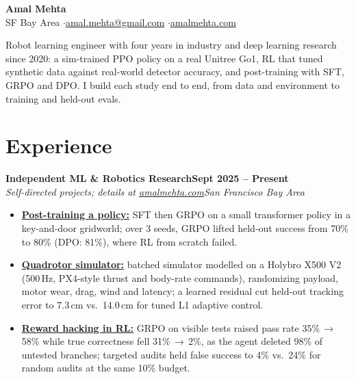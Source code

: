 \documentclass[10pt]{article}
\newcommand{\role}[4]{\textbf{#1}\hfill\textbf{#2}\\\textit{#3}\hfill\textit{#4}}
\begin{document}
\fontsize{9.8}{10.8}\selectfont

\begin{center}
{\LARGE\bfseries Amal Mehta}\\[3pt]
SF Bay Area \quad$\cdot$\quad \href{mailto:amal.mehta@gmail.com}{amal.mehta@gmail.com} \quad$\cdot$\quad \href{https://amalmehta.com/}{amalmehta.com}
\end{center}

Robot learning engineer with four years in industry and deep learning research since 2020: a sim-trained PPO policy on a real Unitree Go1, RL that tuned synthetic data against real-world detector accuracy, and post-training with SFT, GRPO and DPO. I build each study end to end, from data and environment to training and held-out evals.

\section*{Experience}

\role{Independent ML \& Robotics Research}{Sept 2025 -- Present}{Self-directed projects; details at \href{https://amalmehta.com/}{amalmehta.com}}{San Francisco Bay Area}
\begin{itemize}
\item \href{https://github.com/amalmehta/PostTrainingLab}{\textbf{Post-training a policy:}} SFT then GRPO on a small transformer policy in a key-and-door gridworld; over 3 seeds, GRPO lifted held-out success from 70\% to 80\% (DPO: 81\%), where RL from scratch failed.
\item \href{https://amalmehta.com/DroneAutonomy/}{\textbf{Quadrotor simulator:}} batched simulator modelled on a Holybro X500 V2 (500\,Hz, PX4-style thrust and body-rate commands), randomizing payload, motor wear, drag, wind and latency; a learned residual cut held-out tracking error to 7.3\,cm vs.\ 14.0\,cm for tuned L1 adaptive control.
\item \href{https://amalmehta.com/long_term_horizon_planning/}{\textbf{Reward hacking in RL:}} GRPO on visible tests raised pass rate 35\%\,$\to$\,58\% while true correctness fell 31\%\,$\to$\,2\%, as the agent deleted 98\% of untested branches; targeted audits held false success to 4\% vs.\ 24\% for random audits at the same 10\% budget.
\end{itemize}
\end{document}
